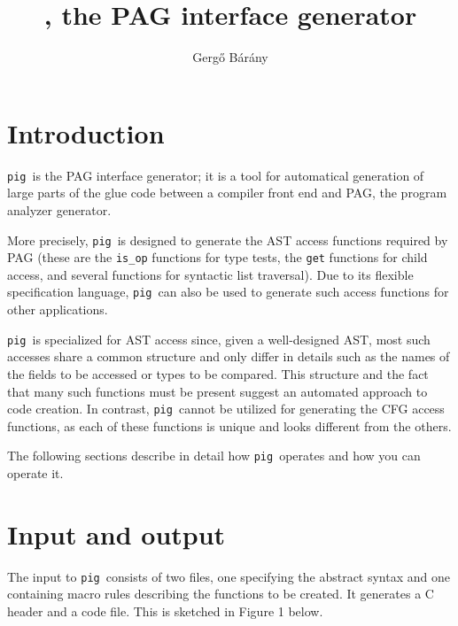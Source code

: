 \documentclass[a4paper,12pt]{article}
\title{\pig, the PAG interface generator}
\author{Gerg\H{o} B\'ar\'any}
\def\pig{{\tt pig}}
\begin{document}
\maketitle

\section{Introduction}
\pig\ is the PAG interface generator; it is a tool for automatical
generation of large parts of the glue code between a compiler front
end and PAG, the program analyzer generator.

More precisely, \pig\ is designed to generate the AST access
functions required by PAG (these are the \verb+is_op+ functions for
type tests, the \verb+get+ functions for child access, and several
functions for syntactic list traversal). Due to its flexible
specification language, \pig\ can also be used to generate such
access functions for other applications.

\pig\ is specialized for AST access since, given a well-designed
AST, most such accesses share a common structure and only differ in
details such as the names of the fields to be accessed or types to
be compared. This structure and the fact that many such functions
must be present suggest an automated approach to code creation.
In contrast, \pig\ cannot be utilized for generating the CFG access
functions, as each of these functions is unique and looks different
from the others.

The following sections describe in detail how \pig\ operates and how
you can operate it.

\section{Input and output}

The input to \pig\ consists of two files, one specifying the
abstract syntax and one containing macro rules describing the
functions to be created. It generates a C header and a code file.
This is sketched in Figure 1 below.
\end{document}
